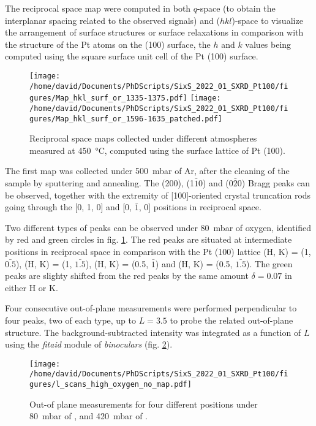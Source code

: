 The reciprocal space map were computed in both $q$-space (to obtain the interplanar spacing related to the observed signals) and ($hkl$)-space to visualize the arrangement of surface structures or surface relaxations in comparison with the structure of the Pt atoms on the (100) surface, the $h$ and $k$ values being computed using the square surface unit cell of the Pt (100) surface.

\begin{figure}[!htb]
    \centering
    \texttt{[image: /home/david/Documents/PhDScripts/SixS\_2022\_01\_SXRD\_Pt100/figures/Map\_hkl\_surf\_or\_1335-1375.pdf]}
    \texttt{[image: /home/david/Documents/PhDScripts/SixS\_2022\_01\_SXRD\_Pt100/figures/Map\_hkl\_surf\_or\_1596-1635\_patched.pdf]}
    \caption{
        Reciprocal space maps collected under different atmospheres measured at \qty{450}{\degreeCelsius}, computed using the surface lattice of Pt (100).
    }
    \label{fig:MapsPt100A}
\end{figure}

The first map was collected under \qty{500}{\milli\bar} of Ar, after the cleaning of the sample by sputtering and annealing.
The (200), (1$\bar{1}$0) and (0$\bar{2}$0) Bragg peaks can be observed, together with the extremity of [100]-oriented crystal truncation rods going through the [0, 1, 0] and [0, $\bar{1}$, 0] positions in reciprocal space.

Two different types of peaks can be observed under \qty{80}{\milli\bar} of oxygen, identified by red and green circles in fig. \ref{fig:MapsPt100A}.
The red peaks are situated at intermediate positions in reciprocal space in comparison with the Pt (100) lattice (H, K) = (1, $\bar{0.5}$), (H, K) = (1, $\bar{1.5}$), (H, K) = (0.5, $\bar{1}$) and (H, K) = (0.5, $\bar{1.5}$).
The green peaks are slighty shifted from the red peaks by the same amount $\delta = 0.07$ in either H or K.

Four consecutive out-of-plane measurements were performed perpendicular to four peaks, two of each type, up to $L=3.5$ to probe the related out-of-plane structure.
The background-subtracted intensity was integrated as a function of $L$ using the \textit{fitaid} module of \textit{binoculars} (fig. \ref{fig:LScansHighOxygenPt100}).

\begin{figure}[!htb]
    \centering
    \texttt{[image: /home/david/Documents/PhDScripts/SixS\_2022\_01\_SXRD\_Pt100/figures/l\_scans\_high\_oxygen\_no\_map.pdf]}
    \caption{
        Out-of plane measurements for four different positions under \qty{80}{\milli\bar} of \dioxygen, and \qty{420}{\milli\bar} of \argon.
    }
    \label{fig:LScansHighOxygenPt100}
\end{figure}


